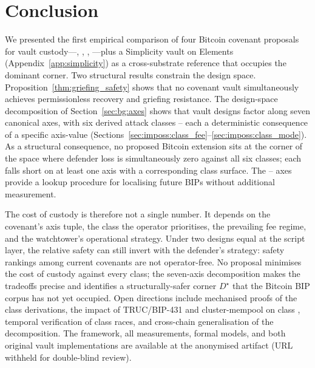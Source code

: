 
\section{Conclusion}
\label{sec:conclusion}

We presented the first empirical comparison of four Bitcoin
covenant proposals for vault custody---\opctv{}, \opccv{},
\opvault{}, \catcsfs{}---plus a Simplicity vault on Elements
(Appendix~\ref{app:simplicity}) as a cross-substrate reference that
occupies the dominant corner. Two structural results constrain the
design space. Proposition~\ref{thm:griefing_safety} shows that no
covenant vault simultaneously achieves permissionless recovery and
griefing resistance. The design-space decomposition of
Section~\ref{sec:bg:axes} shows that vault designs factor along
seven canonical axes, with six derived attack classes
\classfee{}--\classmode{} each a deterministic consequence of a
specific axis-value (Sections~\ref{sec:imposs:class_fee}--\ref{sec:imposs:class_mode}).
As a structural consequence, no proposed Bitcoin extension
sits at the corner of the space where defender loss is
simultaneously zero against all six classes; each falls short on
at least one axis with a corresponding class surface. The
\axauth{}--\axintro{} axes provide a lookup procedure for localising
future BIPs without additional measurement.

The cost of custody is therefore not a single number. It depends on
the covenant's axis tuple, the class the operator prioritises, the
prevailing fee regime, and the watchtower's operational strategy.
Under two designs equal at the script layer, the relative safety can
still invert with the defender's strategy: safety rankings among
current covenants are not operator-free. No proposal minimises the
cost of custody against every class; the seven-axis decomposition
makes the tradeoffs precise and identifies a structurally-safer
corner $D^\star$ that the Bitcoin BIP corpus has not yet occupied.
Open directions include mechanised proofs of the class derivations,
the impact of TRUC/BIP-431 and cluster-mempool on class \classfee{},
temporal verification of class \classhot{} races, and cross-chain
generalisation of the decomposition. The framework, all measurements,
formal models, and both original vault implementations are available
at the anonymised artifact (URL withheld for double-blind review).

\providecommand{\todo}[2][]{\textbf{[TODO: #2]}}
